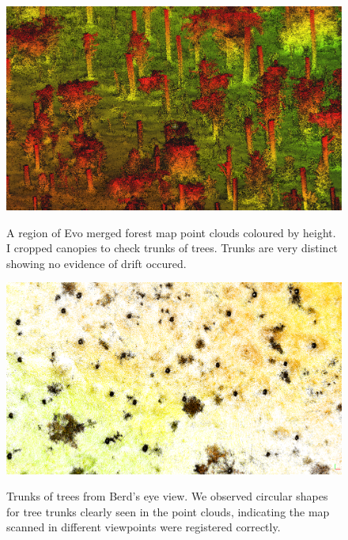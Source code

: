 \begin{figure}[t]
  \centering
  \includegraphics[width=0.9\columnwidth]{pics/exp_3_offline_pointclouds_trunk.png}\label{fig:truk of trees}
  \caption{A region of Evo merged forest map point clouds coloured by height. I cropped canopies to check trunks of trees. Trunks are very distinct showing no evidence of drift occured.}
  \includegraphics[width=0.9\columnwidth]{pics/exp_3_offline_pointclouds_trunk_BV3.png}\label{fig:trunk of trees BV}
  \caption{Trunks of trees from Berd's eye view. We observed circular shapes for tree trunks clearly seen in the point clouds, indicating the map scanned in different viewpoints were registered correctly.}
\end{figure}




